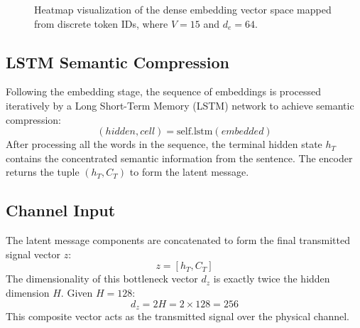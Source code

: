 \documentclass[12pt, a4paper, twocolumn]{article}
\begin{document}
\begin{figure}[htbp]
\centering
{}
\caption{Heatmap visualization of the dense embedding vector space mapped from discrete token IDs, where $V=15$ and $d_e=64$.}
\label{fig:embedding_vector}
\end{figure}

\subsection{\textbf{LSTM Semantic Compression}}
Following the embedding stage, the sequence of embeddings is processed iteratively by a Long Short-Term Memory (LSTM) network to achieve semantic compression:
\begin{equation}
    (hidden, cell) = \text{self.lstm}(embedded)
\end{equation}
After processing all the words in the sequence, the terminal hidden state $h_T$ contains the concentrated semantic information from the sentence. The encoder returns the tuple $(h_T, C_T)$ to form the latent message.

\subsection{\textbf{Channel Input}}
The latent message components are concatenated to form the final transmitted signal vector $z$:
\begin{equation}
    z = [h_T, C_T]
\end{equation}
The dimensionality of this bottleneck vector $d_z$ is exactly twice the hidden dimension $H$. Given $H = 128$:
\begin{equation}
    d_z = 2H = 2 \times 128 = 256
\end{equation}
This composite vector acts as the transmitted signal over the physical channel.
\end{document}
